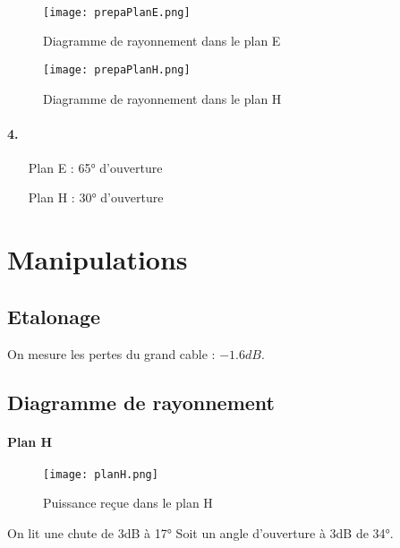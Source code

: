 \documentclass[oneside,a4paper,12pt]{article}
\begin{document}
	\paragraph{}

	\begin{figure}[h]
		\centering
		\texttt{[image: prepaPlanE.png]}
		\caption{Diagramme de rayonnement dans le plan E}
	\end{figure}

	\begin{figure}[h]
		\centering
		\texttt{[image: prepaPlanH.png]}
		\caption{Diagramme de rayonnement dans le plan H}
	\end{figure}

	\paragraph{4.}
	\begin{itemize}
		\item[Plan E] : 65° d'ouverture
		\item[Plan H] : 30° d'ouverture 
	\end{itemize}

	\newpage

	\section{Manipulations}

	\subsection{Etalonage}

	On mesure les pertes du grand cable : $-1.6dB$.
	
	\subsection{Diagramme de rayonnement}

	\paragraph{Plan H}

	\begin{figure}[h]
		\centering
		\texttt{[image: planH.png]}
		\caption{Puissance reçue dans le plan H}
	\end{figure}

	On lit une chute de 3dB à 17° Soit un angle d'ouverture à 3dB de 34°.
\end{document}
